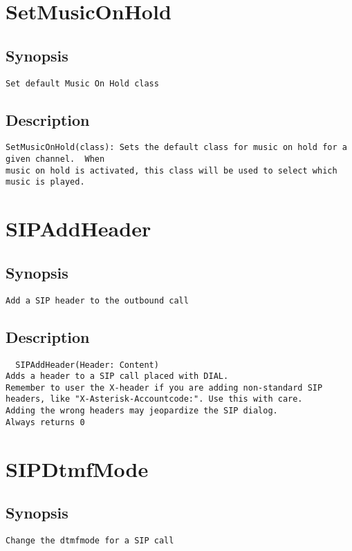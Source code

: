 \section{SetMusicOnHold}
\subsection{Synopsis}
\begin{verbatim}
Set default Music On Hold class
\end{verbatim}
\subsection{Description}
\begin{verbatim}
SetMusicOnHold(class): Sets the default class for music on hold for a given channel.  When
music on hold is activated, this class will be used to select which
music is played.

\end{verbatim}


\section{SIPAddHeader}
\subsection{Synopsis}
\begin{verbatim}
Add a SIP header to the outbound call
\end{verbatim}
\subsection{Description}
\begin{verbatim}
  SIPAddHeader(Header: Content)
Adds a header to a SIP call placed with DIAL.
Remember to user the X-header if you are adding non-standard SIP
headers, like "X-Asterisk-Accountcode:". Use this with care.
Adding the wrong headers may jeopardize the SIP dialog.
Always returns 0

\end{verbatim}


\section{SIPDtmfMode}
\subsection{Synopsis}
\begin{verbatim}
Change the dtmfmode for a SIP call
\end{verbatim}
